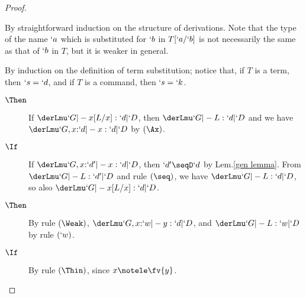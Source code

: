 \documentclass{CSML}
\begin{document}
 \begin{proof} \hfill
 \begin{enumerate} \itemsep 3pt
\item %
By straightforward induction on the structure of derivations. 
Note that the type of the name $`a$ which is substituted for $`b$ in $T[`a/`b]$ is not necessarily the same as that of $`b$ in $T$, but it is weaker in general.

 \item %
By induction on the definition of term substitution; notice that, if $T$ is a term, then $`s = `d$, and if $T$ is a command, then $`s = `k$.

 \begin{description} \itemsep 3pt

 \item [$ T\same x $] 
 \begin {description} 

 \item [$ \Then $] 
If $ \derLmu `G |- x[L/x] : `d | `D $, then $ \derLmu `G |- L : `d | `D $ and we have $ \derLmu `G,x{:}`d |- x : `d | `D $ by $(\Ax)$.

 \item [$ \If $] 
If $ \derLmu `G,x{:}`d' |- x : `d | `D $, then $`d' \seqD `d$ by Lem.\skp\ref{gen lemma}.
From $\derLmu `G |- L : `d' | `D $ and rule $(\seq)$, we have $ \derLmu `G |- L : `d | `D $, so also $ \derLmu `G |- x[L/x] : `d | `D $.

 \end {description}

 \item [$ T\same y\not= x $] 
 \begin {description}
 \item [$ \Then $] By rule $(\Weak)$, $ \derLmu `G,x{:}`w |- y : `d | `D $, and $ \derLmu `G |- L : `w | `D $ by rule $(`w)$.
 \item [$ \If $] By rule $(\Thin)$, since $x \notele \fv{y}$.
 \end {description}


\end{description}
\end{enumerate}
\end{proof}
\end{document}

